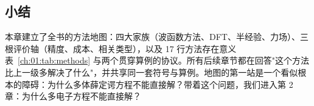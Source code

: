 \subsection*{小结}
本章建立了全书的方法地图：四大家族（波函数方法、DFT、半经验、力场）、三根评价轴（精度、成本、相关类型），以及 17 行方法存在意义表~\ref{ch:01:tab:methods} 与两个贯穿算例的协议。所有后续章节都在回答"这个方法比上一级多解决了什么"，并共享同一套符号与算例。地图的第一站是一个看似根本的障碍：为什么多体薛定谔方程不能直接解？带着这个问题，我们进入第 2 章：为什么多电子方程不能直接解？
